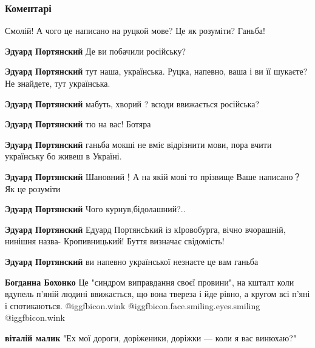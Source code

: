  
 
 
 
 
\subsubsection{Коментарі}

\begin{itemize} %
Смолій! А чого це написано на руцкой мове? Це як розуміти? Ганьба!

\begin{itemize} %
\textbf{Эдуард Портянский} Де ви побачили російську?

\textbf{Эдуард Портянский} тут наша, українська. Руцка, напевно, ваша і ви її шукаєте? Не знайдете, тут українська.

\textbf{Эдуард Портянский} мабуть, хворий ? всюди ввижається російська?

\textbf{Эдуард Портянский} тю на вас! Ботяра

\textbf{Эдуард Портянский} ганьба мокші не вміє відрізнити мови, пора вчити українську бо живеш в Україні.

\textbf{Эдуард Портянский} Шановний！А на якій мові то прізвище Ваше
написано？Як це розуміти

\textbf{Эдуард Портянский} Чого курнув,бідолашний?..

\textbf{Эдуард Портянский} Едуард ПортянсЬкий із кІровобурга, вічно вчорашній, нинішня назва- Кропивницький! Буття визначає свідомість!

\textbf{Эдуард Портянский} ви напевно української незнаєте це вам ганьба

\textbf{Богданна Бохонко} Це "синдром виправдання своєї провини", на кшталт коли вдупель п'яній людині ввижається, що вона твереза і йде рівно, а кругом всі п'яні і спотикаються.  @igg{fbicon.wink}  @igg{fbicon.face.smiling.eyes.smiling}  @igg{fbicon.wink} 

\textbf{віталій малик} "Ех мої дороги, доріженики, доріжки — коли я вас винюхаю?"


\end{itemize}
\end{itemize}
